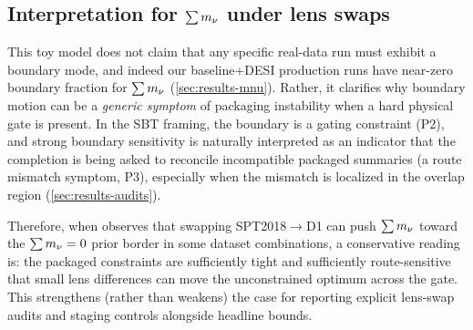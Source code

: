 \subsection{Interpretation for $\sum m_\nu$ under lens swaps}
This toy model does not claim that any specific real-data run must exhibit a boundary mode, and indeed our baseline+DESI production runs have near-zero boundary fraction for $\sum m_\nu$ (\cref{sec:results-mnu}). Rather, it clarifies why boundary motion can be a \emph{generic symptom} of packaging instability when a hard physical gate is present. In the SBT framing, the boundary is a gating constraint (P2), and strong boundary sensitivity is naturally interpreted as an indicator that the completion is being asked to reconcile incompatible packaged summaries (a route mismatch symptom, P3), especially when the mismatch is localized in the overlap region (\cref{sec:results-audits}).

Therefore, when \cite{arxiv2601_16277} observes that swapping SPT2018$\rightarrow$D1 can push $\sum m_\nu$ toward the $\sum m_\nu=0$ prior border in some dataset combinations, a conservative reading is: the packaged constraints are sufficiently tight and sufficiently route-sensitive that small lens differences can move the unconstrained optimum across the gate. This strengthens (rather than weakens) the case for reporting explicit lens-swap audits and staging controls alongside headline bounds.
